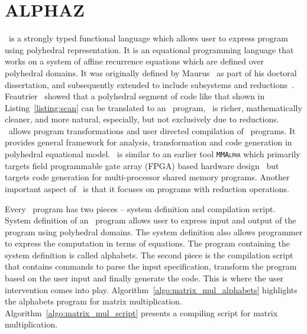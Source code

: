 \section{\uppercase{ALPHAZ}}
 \alfa\ is a strongly typed functional language which allows user to express program using polyhedral representation. It is an equational programming language that works on a system of affine recurrence equations which are defined over polyhedral domains. It was originally defined by Maurus~\cite{Mauras1989} as part of his doctoral dissertation, and subsequently extended to include subsystems and reductions~\cite{leverge-thesis, leverge-parle92, fdupont-asap96, florent-thesis, DupontQuRi93}.  Feautrier~\cite{feautrier91} showed that a polyhedral segment of code like that shown in 
 Listing~\ref{listing:scan} can be translated to an \alfa\ program, \alfa\ is richer, mathematically cleaner, and more natural, especially, but not exclusively due to reductions.  \alphaz\ allows program transformations and user directed compilation of \alfa\ programs.  It provides general framework for analysis, transformation and code generation in polyhedral equational model.  \alphaz\ is similar to an earlier tool \textsc{\texttt{MMAlpha}} which primarily targets field programmable gate array (FPGA) based hardware design~\cite{guillou-mma} but targets code generation for multi-processor shared memory programs.  Another important aspect of \alphaz\ is that it focuses on programs with reduction operations. 

Every  \alfa\ program has two pieces – system definition and compilation script.  System definition of an  \alfa\ program allows user to express input and output of the program using polyhedral domains. 
The system definition also allows programmer to express the computation in terms of equations. The program containing the system definition is called alphabets. The second piece is the compilation script that contains commands to parse the input specification, transform the program based on the user input and finally generate the code. This is where the user intervention comes into play. Algorithm~\ref{algo:matrix_mul_alphabets} highlights the alphabets program for matrix multiplication. Algorithm~\ref{algo:matrix_mul_script} presents a compiling script for matrix multiplication.
